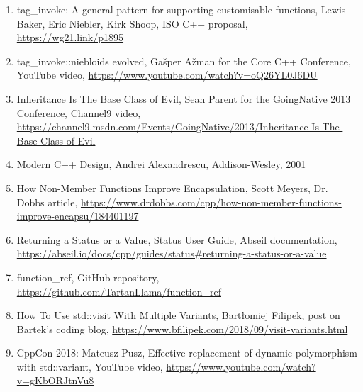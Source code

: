 \begin{enumerate}
\item
tag\_invoke: A general pattern for supporting customisable functions, Lewis Baker, Eric Niebler, Kirk Shoop, ISO C++ proposal, \url{https://wg21.link/p1895}

\item
tag\_invoke::niebloids evolved, Gašper Ažman for the Core C++ Conference, YouTube video, \url{https://www.youtube.com/watch?v=oQ26YL0J6DU}

\item
Inheritance Is The Base Class of Evil, Sean Parent for the GoingNative 2013 Conference, Channel9 video, \url{https://channel9.msdn.com/Events/GoingNative/2013/Inheritance-Is-The-Base-Class-of-Evil}

\item
Modern C++ Design, Andrei Alexandrescu, Addison-Wesley, 2001

\item
How Non-Member Functions Improve Encapsulation, Scott Meyers, Dr. Dobbs article, \url{https://www.drdobbs.com/cpp/how-non-member-functions-improve-encapsu/184401197}

\item
Returning a Status or a Value, Status User Guide, Abseil documentation, \url{https://abseil.io/docs/cpp/guides/status\#returning-a-status-or-a-value}

\item
function\_ref, GitHub repository, \url{https://github.com/TartanLlama/function\_ref}

\item
How To Use std::visit With Multiple Variants, Bartłomiej Filipek, post on Bartek's coding blog, \url{https://www.bfilipek.com/2018/09/visit-variants.html}

\item
CppCon 2018: Mateusz Pusz, Effective replacement of dynamic polymorphism with std::variant, YouTube video, \url{https://www.youtube.com/watch?v=gKbORJtnVu8}
\end{enumerate}